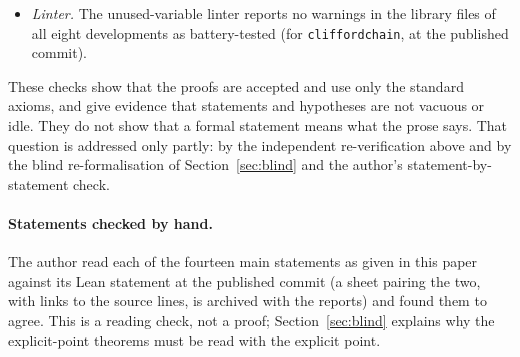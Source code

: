 \documentclass[11pt]{article}
\theoremstyle{definition}
\theoremstyle{remark}
\newcommand{\lean}[1]{\texttt{#1}}
\begin{document}
\begin{itemize}
five of its ten non-collinearity hypotheses (\lean{n135}, \lean{n145}, \lean{n235}, \lean{n245},
\lean{n345}; it has twenty hypotheses in all), the auxiliary lemma \lean{five\_NN} six of its, and \lean{ZD\_ne\_zero} four (all are
non-collinearity hypotheses for triples involving circle 5 or 6; we also confirmed the first two cases
by reading the proofs). These
theorems are stated under more hypotheses than their proofs use; they remain correct. A binder the
unchanged proof needs is not thereby shown to be logically necessary.
\item \emph{Linter.} The unused-variable linter reports no warnings in the library files of all eight
developments as battery-tested (for \lean{cliffordchain}, at the published commit).
\end{itemize}
These checks show that the proofs are accepted and use only the standard axioms, and give evidence
that statements and hypotheses are not vacuous or idle. They do not show that a formal statement means
what the prose says. That question is addressed only partly: by the independent re-verification above
and by the blind re-formalisation of Section~\ref{sec:blind} and the author's
statement-by-statement check.

\paragraph{Statements checked by hand.} The author read each of the fourteen main statements as given in
this paper against its Lean statement at the published commit (a sheet pairing the two, with links to
the source lines, is archived with the reports) and found them to agree. This is a reading check, not a
proof; Section~\ref{sec:blind} explains why the explicit-point theorems must be read with the explicit
point.
\end{document}
